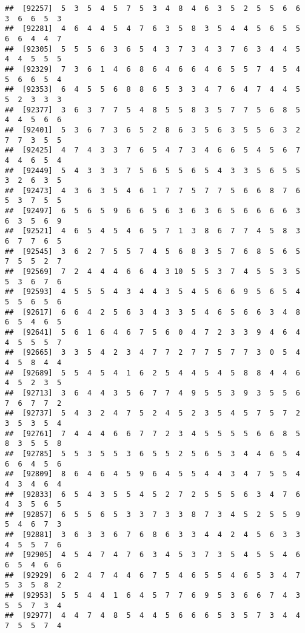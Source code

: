 \documentclass[
]{book}
\begin{document}
\begin{verbatim}
##  [92257]  5  3  5  4  5  7  5  3  4  8  4  6  3  5  2  5  5  6  6  3  6  6  5  3
##  [92281]  4  6  4  4  5  4  7  6  3  5  8  3  5  4  4  5  6  5  5  6  6  4  4  7
##  [92305]  5  5  5  6  3  6  5  4  3  7  3  4  3  7  6  3  4  4  5  4  4  5  5  5
##  [92329]  7  3  6  1  4  6  8  6  4  6  6  4  6  5  5  7  4  5  4  5  6  6  5  4
##  [92353]  6  4  5  5  6  8  8  6  5  3  3  4  7  6  4  7  4  4  5  5  2  3  3  3
##  [92377]  3  6  3  7  7  5  4  8  5  5  8  3  5  7  7  5  6  8  5  4  4  5  6  6
##  [92401]  5  3  6  7  3  6  5  2  8  6  3  5  6  3  5  5  6  3  2  7  7  3  5  5
##  [92425]  4  7  4  3  3  7  6  5  4  7  3  4  6  6  5  4  5  6  7  4  4  6  5  4
##  [92449]  5  4  3  3  3  7  5  6  5  5  6  5  4  3  3  5  6  5  5  3  2  6  3  5
##  [92473]  4  3  6  3  5  4  6  1  7  7  5  7  7  5  6  6  8  7  6  5  3  7  5  5
##  [92497]  6  5  6  5  9  6  6  5  6  3  6  3  6  5  6  6  6  6  3  6  3  5  6  9
##  [92521]  4  6  5  4  5  4  6  5  7  1  3  8  6  7  7  4  5  8  3  6  7  7  6  5
##  [92545]  3  6  2  7  5  5  7  4  5  6  8  3  5  7  6  8  5  6  5  7  5  5  2  7
##  [92569]  7  2  4  4  4  6  6  4  3 10  5  5  3  7  4  5  5  3  5  5  3  6  7  6
##  [92593]  4  5  5  5  4  3  4  4  3  5  4  5  6  6  9  5  6  5  4  5  5  6  5  6
##  [92617]  6  6  4  2  5  6  3  4  3  3  5  4  6  5  6  6  3  4  8  6  5  4  6  5
##  [92641]  5  6  1  6  4  6  7  5  6  0  4  7  2  3  3  9  4  6  4  4  5  5  5  7
##  [92665]  3  3  5  4  2  3  4  7  7  2  7  7  5  7  7  3  0  5  4  4  5  8  4  4
##  [92689]  5  5  4  5  4  1  6  2  5  4  4  5  4  5  8  8  4  4  6  4  5  2  3  5
##  [92713]  3  6  4  4  3  5  6  7  7  4  9  5  5  3  9  3  5  5  6  7  6  7  7  2
##  [92737]  5  4  3  2  4  7  5  2  4  5  2  3  5  4  5  7  5  7  2  3  5  3  5  4
##  [92761]  7  4  4  4  6  6  7  7  2  3  4  5  5  5  5  6  6  8  5  8  3  5  5  8
##  [92785]  5  5  3  5  5  3  6  5  5  2  5  6  5  3  4  4  6  5  4  6  6  4  5  6
##  [92809]  8  6  4  6  4  5  9  6  4  5  5  4  4  3  4  7  5  5  4  4  3  4  6  4
##  [92833]  6  5  4  3  5  5  4  5  2  7  2  5  5  5  6  3  4  7  6  4  3  5  6  5
##  [92857]  6  5  5  6  5  3  3  7  3  3  8  7  3  4  5  2  5  5  9  5  4  6  7  3
##  [92881]  3  6  3  3  6  7  6  8  6  3  3  4  4  2  4  5  6  3  3  4  5  5  7  6
##  [92905]  4  5  4  7  4  7  6  3  4  5  3  7  3  5  4  5  5  4  6  6  5  4  6  6
##  [92929]  6  2  4  7  4  4  6  7  5  4  6  5  5  4  6  5  3  4  7  5  3  5  8  2
##  [92953]  5  5  4  4  1  6  4  5  7  7  6  9  5  3  6  6  7  4  3  5  5  7  3  4
##  [92977]  4  4  7  4  8  5  4  4  5  6  6  6  5  3  5  7  3  4  4  7  5  5  7  4

\end{verbatim}
\end{document}
